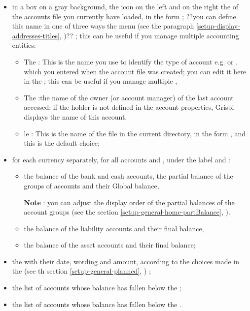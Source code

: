 \begin{itemize}
	 \item in a box on a gray background, the  icon on the left and on the right the  of the accounts file you currently have loaded, in the form    ; ??you can define this name in one of three ways the  menu (see the paragraph \vref{setup-display-addresses-titles}, )?? ; this can be useful if you manage multiple accounting entities:

		\begin{itemize}
			 \item The  : This is the name you use to identify the type of account e.g.   or  , which you entered when the account file was created; you can edit it here in the    ; this can be useful if you manage multiple  , 
			 \item The  :the name of the owner (or  account manager) of the last account accessed; if the holder is not defined in the account properties, Grisbi displays the name of this account,
			 \item le  :  This is the name of the file in the current directory, in the form  , and this is the default choice;
		\end{itemize}
		
	 \item for each currency separately, for all accounts and ,  under the label  and  :
		\begin{itemize}
			 \item the balance of the bank and cash accounts, the partial balance of the groups of accounts and their Global balance,

			 \textbf{Note} : you can adjust the display order of the partial balances of the account groups (see the section \vref{setup-general-home-partBalance}, ).			 
			 \item the balance of the liability accounts and their final balance,
			 \item the balance of the asset accounts and their final balance;
		\end{itemize}
	\item the  with their date, wording and amount, according to the choices made in the  (see th section \vref{setup-general-planned}, ) ;
	\item the list of accounts whose balance has fallen below the   ;
	\item the list of accounts whose balance has fallen below the  .
\end{itemize}

